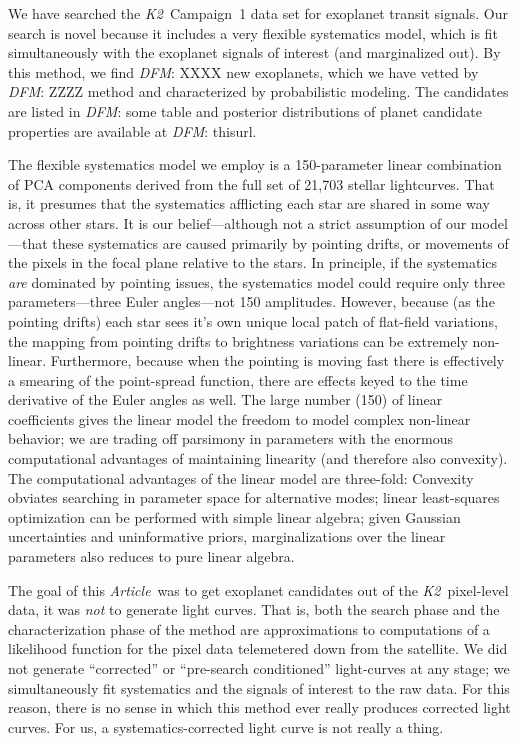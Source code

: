 \documentclass[12pt,preprint]{aastex}
\newcommand{\project}[1]{\textsl{#1}} %
\newcommand{\KT}{\project{K2}}
\newcommand{\paper}{\textsl{Article}}
\newcommand{\todo}[3]{{\color{#2}\emph{#1}: #3}}
\newcommand{\dfmtodo}[1]{\todo{DFM}{red}{#1}}
\begin{document}
We have searched the \KT\ Campaign~1 data set for exoplanet transit signals.
Our search is novel because it includes a very flexible systematics model,
which is fit simultaneously with the exoplanet signals of interest (and
marginalized out).
By this method, we find \dfmtodo{XXXX} new exoplanets, which we have vetted by \dfmtodo{ZZZZ}
method and characterized by probabilistic modeling.
The candidates are listed in \dfmtodo{some table} and
posterior distributions of planet candidate properties are available at
\dfmtodo{thisurl}.

The flexible systematics model we employ is a 150-parameter linear combination of PCA components
derived from the full set of 21,703 stellar lightcurves.
That is, it presumes that the systematics afflicting each star are shared in
some way across other stars.
It is our belief---although not a strict assumption of our model---that these
systematics are caused primarily by pointing drifts, or movements of the
pixels in the focal plane relative to the stars.
In principle, if the systematics \emph{are} dominated by pointing issues, the
systematics model could require only three parameters---three Euler
angles---not 150 amplitudes.
However, because (as the pointing drifts) each star sees it's own unique
local patch of flat-field variations, the mapping from pointing drifts to
brightness variations can be extremely non-linear.
Furthermore, because when the pointing is moving fast there is effectively
a smearing of the point-spread function, there are effects keyed to the
time derivative of the Euler angles as well.
The large number (150) of linear coefficients gives the linear model the
freedom to model complex non-linear behavior; we are trading off parsimony
in parameters with the enormous computational advantages of maintaining
linearity (and therefore also convexity).
The computational advantages of the linear model are three-fold:
Convexity obviates searching in parameter space for alternative modes;
linear least-squares optimization can be performed with simple linear algebra;
given Gaussian uncertainties and uninformative priors, marginalizations over
the linear parameters also reduces to pure linear algebra.

The goal of this \paper\ was to get exoplanet candidates out of the
\KT\ pixel-level data, it was \emph{not} to generate light curves.
That is, both the search phase and the characterization phase of the method
are approximations to computations of a likelihood function for the pixel
data telemetered down from the satellite.
We did not generate ``corrected'' or ``pre-search conditioned'' light-curves
at any stage; we simultaneously fit systematics and the signals of interest
to the raw data.
For this reason, there is no sense in which this method ever really
produces corrected light curves.
For us, a systematics-corrected light curve is not really a thing.
\end{document}
